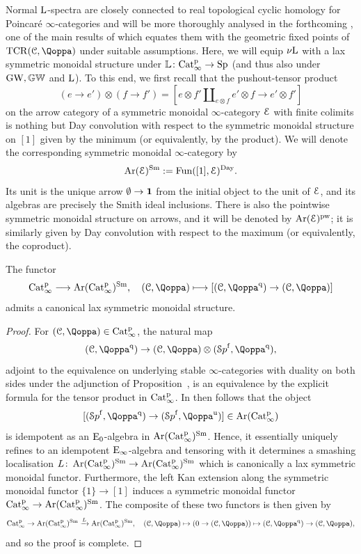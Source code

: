 Normal $\operatorname L$-spectra are closely connected to real topological cyclic homology for Poincar\'e $\infty$-categories and will be more thoroughly analysed in the forthcoming \cite{Harpaz-Nikolaus-Shah}, one of the main results of which equates them with the geometric fixed points of $\mathrm{TCR}(\C,\QF)$ under suitable assumptions.
Here, we will equip ${\nu\!\operatorname L}$ with a lax symmetric monoidal structure under $\mathbb{L} \colon \mathrm{Cat}^{\mathrm p}_\infty \rightarrow \mathrm{Sp}$ (and thus also under $\operatorname{GW},\mathbb{GW}$ and $\operatorname L$). 
To this end, we first recall that the pushout-tensor product 
\[
(e \rightarrow e') \otimes (f \rightarrow f') = [e\otimes f' \amalg_{e \otimes f} e' \otimes f \rightarrow e' \otimes f']
\]
on the arrow category of a symmetric monoidal $\infty$-category $\mathcal{E}$ with finite colimits is nothing but Day convolution 
with respect to the symmetric monoidal structure on $[1]$ given by the minimum (or equivalently, by the product). We will denote the corresponding symmetric monoidal $\infty$-category by 
\[
\operatorname{Ar}(\mathcal{E})^{\mathrm{Sm}} := \operatorname{Fun}([1],\mathcal{E})^{\mathrm{Day}}.
\]
Its unit is the unique arrow $\emptyset \to \mathbf{1}$ from the initial object to the unit of $\mathcal{E}$, and its algebras %
are precisely the Smith ideal inclusions.
There is also the pointwise symmetric monoidal structure on arrows, and it will be denoted by $\operatorname{Ar}(\mathcal{E})^{\mathrm{pw}}$; it is similarly given by Day convolution with respect to the maximum (or equivalently, the coproduct). 


\begin{proposition}
\label{proposition:qdr-lax-monoidal}%
The functor 
\[
\Catp \longrightarrow \Ar(\Catp)^{\Sm}, \quad (\C,\QF) \longmapsto [(\C,\QF^\qdr) \rightarrow (\C,\QF)]
\]
admits a canonical lax symmetric monoidal structure.
\end{proposition}  
\begin{proof}
For $(\C,\QF) \in \Catp$, the natural map 
\[
(\C,\QF^{\qdr}) \to (\C,\QF) \otimes (\Spaf,\QF^\qdr),
\]
adjoint to the equivalence on underlying stable $\infty$-categories with duality on both sides under the adjunction of Proposition~,
is an equivalence by the explicit formula for the tensor product in $\mathrm{Cat}^{\mathrm p}_\infty$.
In then follows that the object
\[
[(\Spaf,\QF^\qdr) \to (\Spaf,\QF^\uni)] \in \Ar(\Catp)
\]
is idempotent as an ${\mathrm{E}_{0}}$-algebra in $\operatorname{Ar}(\mathrm{Cat}^{\mathrm p}_\infty)^{\mathrm{Sm}}$. Hence, it essentially uniquely refines to an idempotent ${\mathrm{E}_{\infty}}$-algebra and tensoring with it determines a smashing localisation $L \colon \operatorname{Ar}(\mathrm{Cat}^{\mathrm p}_\infty)^{\mathrm{Sm}} \to \operatorname{Ar}(\mathrm{Cat}^{\mathrm p}_\infty)^{\mathrm{Sm}}$ which is canonically a lax symmetric monoidal functor. Furthermore, the left Kan extension along the symmetric monoidal functor $\{1\} \to [1]$ induces a symmetric monoidal functor $\mathrm{Cat}^{\mathrm p}_\infty \to \operatorname{Ar}(\mathrm{Cat}^{\mathrm p}_\infty)^{\mathrm{Sm}}$. The composite of these two functors is then given by
\[
\Catp \to \Ar(\Catp)^{\Sm} \xrightarrow{L} \Ar(\Catp)^{\Sm}, \quad (\C,\QF) \mapsto (0\to (\C,\QF)) \mapsto (\C,\QF^\qdr) \to (\C,\QF),
\]
and so the proof is complete.
\end{proof}

